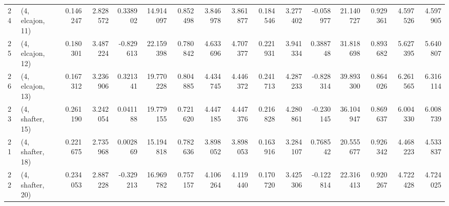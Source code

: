 \begin{tabular}{llrrrrrrrrrrrrrr}
24 &  (4, elcajon, 11) &   0.146247 &  2.828572 &  0.338902 &  14.914097 &  0.852498 &   3.846978 &  3.861877 &  0.184546 &  3.277402 & -0.058977 &   21.140727 &  0.929361 &   4.597526 &   4.597905 \\
25 &  (4, elcajon, 12) &   0.180301 &  3.487224 & -0.829613 &  22.159398 &  0.780842 &   4.633696 &  4.707377 &  0.221931 &  3.941334 &  0.388748 &   31.818698 &  0.893682 &   5.627395 &   5.640807 \\
26 &  (4, elcajon, 13) &   0.167312 &  3.236906 &  0.321341 &  19.770228 &  0.804885 &   4.434745 &  4.446372 &  0.241713 &  4.287233 & -0.828314 &   39.893300 &  0.864026 &   6.261565 &   6.316114 \\
23 &  (4, shafter, 15) &   0.261190 &  3.242054 &  0.041188 &  19.779155 &  0.721620 &   4.447185 &  4.447376 &  0.216828 &  4.280861 & -0.230145 &   36.104947 &  0.869637 &   6.004330 &   6.008739 \\
21 &  (4, shafter, 18) &   0.221675 &  2.735968 &  0.002869 &  15.194818 &  0.782636 &   3.898052 &  3.898053 &  0.163916 &  3.284107 &  0.768542 &   20.555677 &  0.926342 &   4.468223 &   4.533837 \\
22 &  (4, shafter, 20) &   0.234053 &  2.887228 & -0.329213 &  16.969782 &  0.757157 &   4.106264 &  4.119440 &  0.170720 &  3.425306 & -0.122814 &   22.316413 &  0.920267 &   4.722428 &   4.724025 \\
\bottomrule
\end{tabular}
